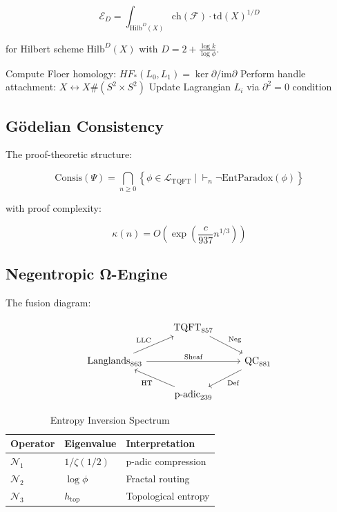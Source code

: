 \documentclass[12pt]{article}
\begin{document}
\begin{equation}
\mathcal{E}_D = \int_{\text{Hilb}^D(X)} \text{ch}(\mathscr{F}) \cdot \text{td}(X)^{1/D}
\end{equation}

for Hilbert scheme $\text{Hilb}^D(X)$ with $D = 2 + \frac{\log k}{\log\phi}$.

\begin{algorithm}[H]
\caption{Automorphic Topological Surgery}
\begin{algorithmic}[1]
\STATE Compute Floer homology: $HF_*(L_0,L_1) = \ker \partial/\text{im}\partial$
\STATE Perform handle attachment: $X \leftrightarrow X \# (S^2 \times S^2)$
\STATE Update Lagrangian $L_i$ via $\partial^2 = 0$ condition
\ENDWHILE
\end{algorithmic}
\end{algorithm}

\subsection{Gödelian Consistency}
The proof-theoretic structure:

\begin{equation}
\text{Consis}(\Psi) = \bigcap_{n\geq0} \left\{ \phi \in \mathcal{L}_{\text{TQFT}} \mid \vdash_n \neg \text{EntParadox}(\phi) \right\}
\end{equation}

with proof complexity:

\begin{equation}
\kappa(n) = O\left(\exp\left(\frac{c}{937}n^{1/3}\right)\right)
\end{equation}

\subsection{Negentropic Ω-Engine}
The fusion diagram:

\begin{equation}
\begin{tikzcd}
& \text{TQFT}_{857} \arrow[dr,"\text{Neg}"] & \\
\text{Langlands}_{863} \arrow[ur,"\text{LLC}"] \arrow[rr,"\text{Sheaf}"] & & \text{QC}_{881} \arrow[dl,"\text{Def}"] \\
& \text{p-adic}_{239} \arrow[ul,"\text{HT}"] & 
\end{tikzcd}
\end{equation}

\begin{table}[H]
\centering
\caption{Entropy Inversion Spectrum}
\begin{tabular}{lll}
\textbf{Operator} & \textbf{Eigenvalue} & \textbf{Interpretation} \\
\hline
$\mathcal{N}_1$ & $1/\zeta(1/2)$ & p-adic compression \\
$\mathcal{N}_2$ & $\log \phi$ & Fractal routing \\
$\mathcal{N}_3$ & $h_{\text{top}}$ & Topological entropy \\
\end{tabular}
\end{table}
\end{document}
